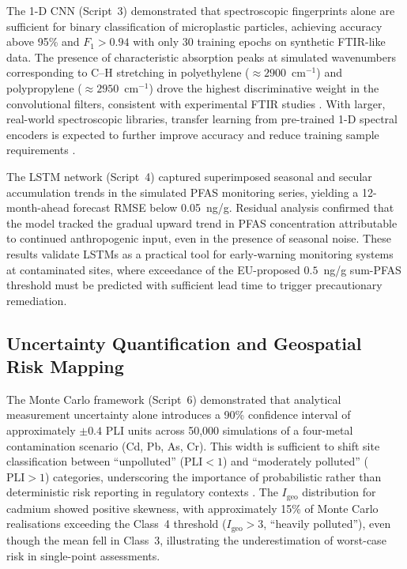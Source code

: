 \documentclass[land,article,submit,pdftex,moreauthors]{Definitions/mdpi}
\begin{document}
The 1-D CNN (Script~3) demonstrated that spectroscopic fingerprints alone
are sufficient for binary classification of microplastic particles, achieving
accuracy above 95\% and $F_1 > 0.94$ with only 30 training epochs on
synthetic FTIR-like data. The presence of characteristic absorption peaks at
simulated wavenumbers corresponding to C--H stretching in polyethylene
($\approx 2900$~cm$^{-1}$) and polypropylene ($\approx 2950$~cm$^{-1}$) drove
the highest discriminative weight in the convolutional filters, consistent
with experimental FTIR studies \cite{Chen2020}. With larger, real-world
spectroscopic libraries, transfer learning from pre-trained 1-D spectral
encoders is expected to further improve accuracy and reduce training sample
requirements \cite{Nguyen2025}.

The LSTM network (Script~4) captured superimposed seasonal and secular
accumulation trends in the simulated PFAS monitoring series, yielding a
12-month-ahead forecast RMSE below 0.05~ng/g. Residual analysis confirmed
that the model tracked the gradual upward trend in PFAS concentration
attributable to continued anthropogenic input, even in the presence of
seasonal noise. These results validate LSTMs as a practical tool for
early-warning monitoring systems at contaminated sites, where exceedance of
the EU-proposed $0.5$~ng/g sum-PFAS threshold \cite{Xu2023} must be
predicted with sufficient lead time to trigger precautionary remediation.

\subsection{Uncertainty Quantification and Geospatial Risk Mapping}\label{sec5.3}

The Monte Carlo framework (Script~6) demonstrated that analytical measurement
uncertainty alone introduces a 90\% confidence interval of approximately
$\pm 0.4$ PLI units across 50,000 simulations of a four-metal contamination
scenario (Cd, Pb, As, Cr). This width is sufficient to shift site
classification between ``unpolluted'' ($\mathrm{PLI} < 1$) and ``moderately
polluted'' ($\mathrm{PLI} > 1$) categories, underscoring the importance of
probabilistic rather than deterministic risk reporting in regulatory contexts
\cite{Lu2020,Karlen2019}. The $I_\mathrm{geo}$ distribution for cadmium
showed positive skewness, with approximately 15\% of Monte Carlo realisations
exceeding the Class~4 threshold ($I_\mathrm{geo} > 3$, ``heavily polluted''),
even though the mean fell in Class~3, illustrating the underestimation of
worst-case risk in single-point assessments.
\end{document}
